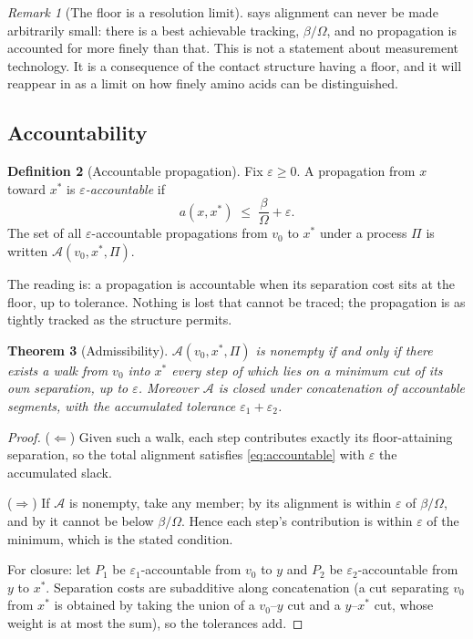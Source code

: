\documentclass[11pt,twocolumn,a4paper]{article}
\theoremstyle{thmstyle}
\newtheorem{theorem}{Theorem}[section]
\theoremstyle{definition}
\newtheorem{definition}[theorem]{Definition}
\theoremstyle{remark}
\newtheorem{remark}[theorem]{Remark}
\newcommand{\flo}{\beta}
\newcommand{\acc}{\mathcal{A}}
\newcommand{\Proc}{\Pi}
\newcommand{\eps}{\varepsilon}
\begin{document}
\begin{remark}[The floor is a resolution limit]
 says alignment can never be made arbitrarily
small: there is a best achievable tracking, $\flo/\Omega$, and no
propagation is accounted for more finely than that. This is not a
statement about measurement technology. It is a consequence of the
contact structure having a floor, and it will reappear in
 as a limit on how finely amino acids can be
distinguished.
\end{remark}

\subsection{Accountability}

\begin{definition}[Accountable propagation]
\label{def:accountable}
Fix $\eps \geq 0$. A propagation from $x$ toward $x^{*}$ is
\emph{$\eps$-accountable} if
\begin{equation}
  a(x, x^{*}) \;\leq\; \frac{\flo}{\Omega} + \eps .
  \label{eq:accountable}
\end{equation}
The set of all $\eps$-accountable propagations from $v_0$ to $x^{*}$
under a process $\Proc$ is written $\acc(v_0, x^{*}, \Proc)$.
\end{definition}

The reading is: a propagation is accountable when its separation cost
sits at the floor, up to tolerance. Nothing is lost that cannot be
traced; the propagation is as tightly tracked as the structure permits.

\begin{theorem}[Admissibility]
\label{thm:admissibility}
$\acc(v_0, x^{*}, \Proc)$ is nonempty if and only if there exists a
walk from $v_0$ into $x^{*}$ every step of which lies on a minimum
cut of its own separation, up to $\eps$. Moreover $\acc$ is closed
under concatenation of accountable segments, with the accumulated
tolerance $\eps_1 + \eps_2$.
\end{theorem}

\begin{proof}
($\Leftarrow$) Given such a walk, each step contributes exactly its
floor-attaining separation, so the total alignment satisfies
\eqref{eq:accountable} with $\eps$ the accumulated slack.

($\Rightarrow$) If $\acc$ is nonempty, take any member; by
 its alignment is within $\eps$ of $\flo/\Omega$,
and by  it cannot be below $\flo/\Omega$. Hence
each step's contribution is within $\eps$ of the minimum, which is the
stated condition.

For closure: let $P_1$ be $\eps_1$-accountable from $v_0$ to $y$ and
$P_2$ be $\eps_2$-accountable from $y$ to $x^{*}$. Separation costs are
subadditive along concatenation (a cut separating $v_0$ from $x^{*}$
is obtained by taking the union of a $v_0$--$y$ cut and a $y$--$x^{*}$
cut, whose weight is at most the sum), so the tolerances add.
\end{proof}
\end{document}
